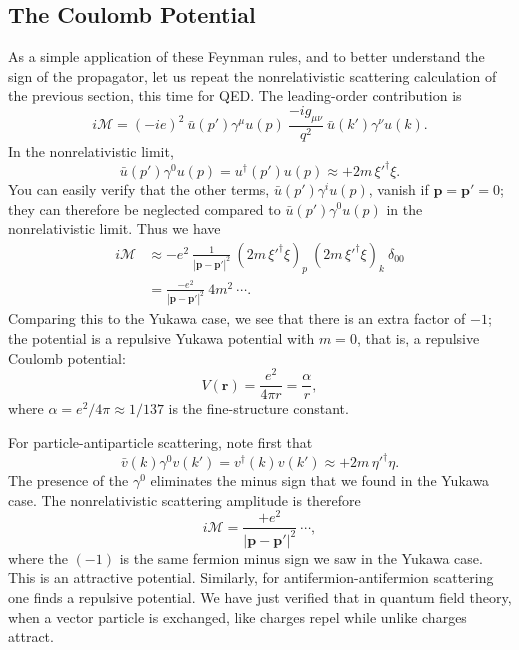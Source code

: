 \subsection{The Coulomb Potential}

As a simple application of these Feynman rules, and to better understand the
sign of the propagator, let us repeat the nonrelativistic scattering
calculation of the previous section, this time for QED.  The leading-order
contribution is
\begin{equation}
  i\mathcal{M} = (-ie)^2\ \bar{u}(p')\gamma^\mu u(p)\
    \frac{-ig_{\mu\nu}}{q^2}\ \bar{u}(k')\gamma^\nu u(k) .
  \label{eq:4.133b}
\end{equation}
In the nonrelativistic limit,
\begin{equation}
  \bar{u}(p')\gamma^0 u(p) = u^{\dagger}(p')u(p) \approx +2m\,\xi'^{\dagger}\xi .
\end{equation}
You can easily verify that the other terms, $\bar{u}(p')\gamma^i u(p)$,
vanish if $\mathbf{p} = \mathbf{p}' = 0$; they can therefore be neglected
compared to $\bar{u}(p')\gamma^0 u(p)$ in the nonrelativistic limit.  Thus we
have
\begin{equation}
  \begin{aligned}
    i\mathcal{M} &\approx -e^2\ \frac{1}{|\mathbf{p}-\mathbf{p}'|^2}\
      (2m\,\xi'^{\dagger}\xi)_p\ (2m\,\xi'^{\dagger}\xi)_k\ \delta_{00}\\
    &= \frac{-e^2}{|\mathbf{p}-\mathbf{p}'|^2}\ 4m^2\ \cdots .
  \end{aligned}
  \label{eq:4.134}
\end{equation}
Comparing this to the Yukawa case, we see that there is an extra factor of
$-1$; the potential is a repulsive Yukawa potential with $m=0$, that is, a
repulsive Coulomb potential:
\begin{equation}
  V(\mathbf{r}) = \frac{e^2}{4\pi r} = \frac{\alpha}{r},
  \label{eq:4.135}
\end{equation}
where $\alpha = e^2/4\pi \approx 1/137$ is the fine-structure constant.

For particle-antiparticle scattering, note first that
\begin{equation}
  \bar{v}(k)\gamma^0 v(k') = v^{\dagger}(k)v(k') \approx +2m\,\eta'^{\dagger}\eta .
\end{equation}
The presence of the $\gamma^0$ eliminates the minus sign that we found in the
Yukawa case.  The nonrelativistic scattering amplitude is therefore
\begin{equation}
  i\mathcal{M} = \frac{+e^2}{|\mathbf{p}-\mathbf{p}'|^2}\ \cdots ,
\end{equation}
where the $(-1)$ is the same fermion minus sign we saw in the Yukawa case.
This is an attractive potential.  Similarly, for antifermion-antifermion
scattering one finds a repulsive potential.  We have just verified that in
quantum field theory, when a vector particle is exchanged, like charges repel
while unlike charges attract.

